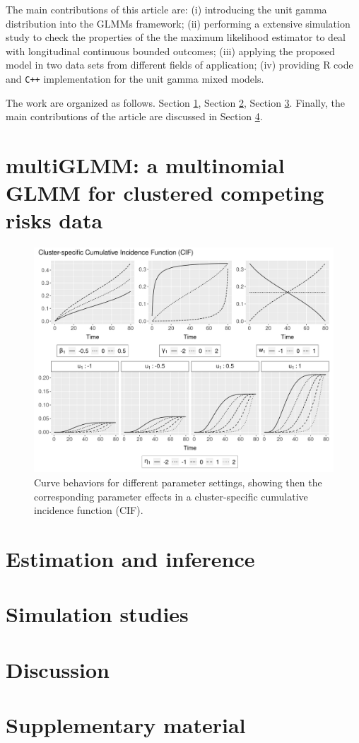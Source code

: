\documentclass[a4paper,12pt]{article}
\begin{document}
The main contributions of this article are: (i) introducing the unit
gamma distribution into the GLMMs framework; (ii) performing a extensive
simulation study to check the properties of the the maximum likelihood
estimator to deal with longitudinal continuous bounded outcomes; (iii)
applying the proposed model in two data sets from different fields of
application; (iv) providing R code and \texttt{C++} implementation for
the unit gamma mixed models.

The work are organized as follows. Section \ref{model}, Section
\ref{inference}, Section \ref{simulation}. Finally, the main
contributions of the article are discussed in Section \ref{discussion}.

\section{multiGLMM: a multinomial GLMM for clustered competing risks data}
\label{model}

\begin{figure}[H]
 \centering \includegraphics[width=\linewidth]{pics/cifstudy-1.png}
 \vspace{-0.75cm}
 \caption{Curve behaviors for different parameter settings, showing then
   the corresponding parameter effects in a cluster-specific cumulative
   incidence function (CIF).}
 \label{fig:cifcoefs}
\end{figure}

\section{Estimation and inference}
\label{inference}

\section{Simulation studies}
\label{simulation}

\section{Discussion}
\label{discussion}

\section*{Supplementary material}



\end{document}
